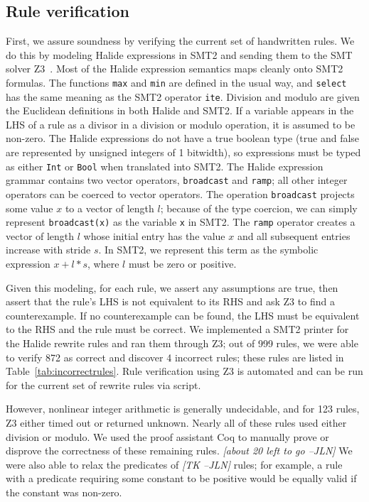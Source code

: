\documentclass[sigplan,review,anonymous]{acmart}\settopmatter{printfolios=true,printccs=false,printacmref=false}
\newcommand{\jln}[1]{\textcolor{uwpurple}{\textit{[{#1} --JLN]}}}
\begin{document}
\subsection{Rule verification}

First, we assure soundness by verifying the current set of handwritten rules. We do this by modeling Halide expressions in SMT2 and sending them to the SMT solver Z3~\cite{de2008z3}. Most of the Halide expression semantics maps cleanly onto SMT2 formulas. The functions \texttt{max} and \texttt{min} are defined in the usual way, and \texttt{select} has the same meaning as the SMT2 operator \texttt{ite}. Division and modulo are given the Euclidean definitions in both Halide and SMT2. If a variable appears in the LHS of a rule as a divisor in a division or modulo operation, it is assumed to be non-zero. The Halide expressions do not have a true boolean type (true and false are represented by unsigned integers of 1 bitwidth), so expressions must be typed as either \texttt{Int} or \texttt{Bool} when translated into SMT2. The Halide expression grammar contains two vector operators, \texttt{broadcast} and \texttt{ramp}; all other integer operators can be coerced to vector operators. The operation \texttt{broadcast} projects some value $x$ to a vector of length $l$; because of the type coercion, we can simply represent \texttt{broadcast(x)} as the variable \texttt{x} in SMT2. The \texttt{ramp} operator creates a vector of length $l$ whose initial entry has the value $x$ and all subsequent entries increase with stride $s$. In SMT2, we represent this term as the symbolic expression $x + l * s$, where $l$ must be zero or positive.

Given this modeling, for each rule, we assert any assumptions are true, then assert that the rule's LHS is not equivalent to its RHS and ask Z3 to find a counterexample. If no counterexample can be found, the LHS must be equivalent to the RHS and the rule must be correct. We implemented a SMT2 printer for the Halide rewrite rules and ran them through Z3; out of 999 rules, we were able to verify 872 as correct and discover 4 incorrect rules; these rules are listed in Table~\ref{tab:incorrectrules}. Rule verification using Z3 is automated and can be run for the current set of rewrite rules via script.

However, nonlinear integer arithmetic is generally undecidable, and for 123 rules, Z3 either timed out or returned unknown. Nearly all of these rules used either division or modulo. We used the proof assistant Coq to manually prove or disprove the correctness of these remaining rules. \jln{about 20 left to go} We were also able to relax the predicates of \jln{TK} rules; for example, a rule with a predicate requiring some constant to be positive would be equally valid if the constant was non-zero.
\end{document}
